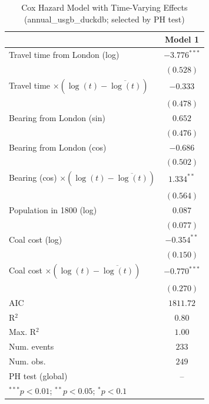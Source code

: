 
\begin{table}
\begin{center}
\begin{tabular}{l c}
\hline
 & Model 1 \\
\hline
Travel time from London (log) & $-3.776^{***}$ \\
 & $(0.528)$ \\
Travel time $\times (\log(t)-\overline{\log(t)})$ & $-0.333$ \\
 & $(0.478)$ \\
Bearing from London (sin) & $0.652$ \\
 & $(0.476)$ \\
Bearing from London (cos) & $-0.686$ \\
 & $(0.502)$ \\
Bearing (cos) $\times (\log(t)-\overline{\log(t)})$ & $1.334^{**}$ \\
 & $(0.564)$ \\
Population in 1800 (log) & $0.087$ \\
 & $(0.077)$ \\
Coal cost (log) & $-0.354^{**}$ \\
 & $(0.150)$ \\
Coal cost $\times (\log(t)-\overline{\log(t)})$ & $-0.770^{***}$ \\
 & $(0.270)$ \\
\hline
AIC              & $1811.72$ \\
R$^2$            & $0.80$ \\
Max. R$^2$       & $1.00$ \\
Num. events      & $233$ \\
Num. obs.        & $249$ \\
PH test (global) & -- \\
\hline
\multicolumn{2}{l}{\scriptsize{$^{***}p<0.01$; $^{**}p<0.05$; $^{*}p<0.1$}}
\end{tabular}
\caption{Cox Hazard Model with Time-Varying Effects (annual\_usgb\_duckdb; selected by PH test)}
\label{tab:cox_serious_tv_annual_usgb_duckdb}
\end{center}
\end{table}
